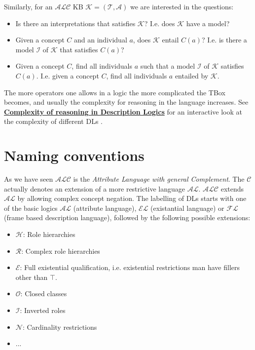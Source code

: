 Similarly, for an $\mathcal{ALC}$ KB $\mathcal{K} = (\mathcal{T}, \mathcal{A})$ we are interested in the questions:
\begin{itemize}
    \item Is there an interpretations that satisfies $\mathcal{K}$? I.e. does $\mathcal{K}$ have a model?
    \item Given a concept $C$ and an individual $a$, does $\mathcal{K}$ entail $C(a)$? I.e. is there a model $\mathcal{I}$ of $\mathcal{K}$ that satisfies $C(a)$?
    \item Given a concept $C$, find all individuals $a$ such that a model $\mathcal{I}$ of $\mathcal{K}$ satisfies $C(a)$. I.e. given a concept $C$, find all individuals $a$ entailed by $\mathcal{K}$.
\end{itemize}

The more operators one allows in a logic the more complicated the TBox becomes, and usually the complexity for reasoning in the language increases. See \href{http://www.cs.man.ac.uk/~ezolin/dl/}{\textbf{Complexity of reasoning in Description Logics}} for an interactive look at the complexity of different DLs \cite{zolin_2013}.

\section{Naming conventions}

As we have seen $\mathcal{ALC}$ is the \textit{Attribute Language with general Complement}. The $\mathcal{C}$ actually denotes an extension of a more restrictive language $\mathcal{AL}$. $\mathcal{ALC}$ extends $\mathcal{AL}$ by allowing complex concept negation. The labelling of DLs starts with one of the basic logics $\mathcal{AL}$ (attribute language), $\mathcal{EL}$ (existantial language) or $\mathcal{FL}$ (frame based description language), followed by the following possible extensions:
\begin{itemize}
    \item $\mathcal{H}$: Role hierarchies
    \item $\mathcal{R}$: Complex role hierarchies
    \item $\mathcal{E}$: Full existential qualification, i.e. existential restrictions man have fillers other than $\top$.
    \item $\mathcal{O}$: Closed classes
    \item $\mathcal{I}$: Inverted roles
    \item $\mathcal{N}$: Cardinality restrictions
    \item ... 
\end{itemize}



